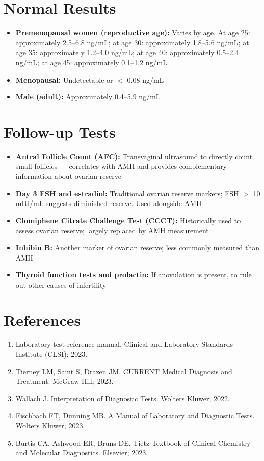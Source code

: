\section*{Normal Results}
\begin{itemize}
  \item \textbf{Premenopausal women (reproductive age):} Varies by age. At age 25: approximately 2.5--6.8 ng/mL; at age 30: approximately 1.8--5.6 ng/mL; at age 35: approximately 1.2--4.0 ng/mL; at age 40: approximately 0.5--2.4 ng/mL; at age 45: approximately 0.1--1.2 ng/mL
  \item \textbf{Menopausal:} Undetectable or $<$ 0.08 ng/mL
  \item \textbf{Male (adult):} Approximately 0.4--5.9 ng/mL
\end{itemize}

\section*{Follow-up Tests}
\begin{itemize}
  \item \textbf{Antral Follicle Count (AFC):} Transvaginal ultrasound to directly count small follicles --- correlates with AMH and provides complementary information about ovarian reserve
  \item \textbf{Day 3 FSH and estradiol:} Traditional ovarian reserve markers; FSH $>$ 10 mIU/mL suggests diminished reserve. Used alongside AMH
  \item \textbf{Clomiphene Citrate Challenge Test (CCCT):} Historically used to assess ovarian reserve; largely replaced by AMH measurement
  \item \textbf{Inhibin B:} Another marker of ovarian reserve; less commonly measured than AMH
  \item \textbf{Thyroid function tests and prolactin:} If anovulation is present, to rule out other causes of infertility
\end{itemize}


\section*{References}
\begin{enumerate}
  \item Laboratory test reference manual. Clinical and Laboratory Standards Institute (CLSI); 2023.
  \item Tierney LM, Saint S, Drazen JM. CURRENT Medical Diagnosis and Treatment. McGraw-Hill; 2023.
  \item Wallach J. Interpretation of Diagnostic Tests. Wolters Kluwer; 2022.
  \item Fischbach FT, Dunning MB. A Manual of Laboratory and Diagnostic Tests. Wolters Kluwer; 2023.
  \item Burtis CA, Ashwood ER, Bruns DE. Tietz Textbook of Clinical Chemistry and Molecular Diagnostics. Elsevier; 2023.
\end{enumerate}

\clearpage

